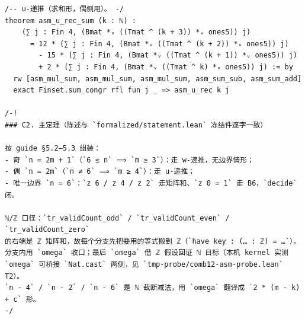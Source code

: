 \documentclass[11pt]{article}
\begin{document}
\begin{lstlisting}
/-- u-递推（求和形，偶侧用）。 -/
theorem asm_u_rec_sum (k : ℕ) :
    (∑ j : Fin 4, (Bmat *ᵥ ((Tmat ^ (k + 3)) *ᵥ ones5)) j)
      = 12 * (∑ j : Fin 4, (Bmat *ᵥ ((Tmat ^ (k + 2)) *ᵥ ones5)) j)
        - 15 * (∑ j : Fin 4, (Bmat *ᵥ ((Tmat ^ (k + 1)) *ᵥ ones5)) j)
        + 2 * (∑ j : Fin 4, (Bmat *ᵥ ((Tmat ^ k) *ᵥ ones5)) j) := by
  rw [asm_mul_sum, asm_mul_sum, asm_mul_sum, asm_sum_sub, asm_sum_add]
  exact Finset.sum_congr rfl fun j _ => asm_u_rec k j

/-!
### C2. 主定理（陈述与 `formalized/statement.lean` 冻结件逐字一致）

按 guide §5.2–5.3 组装：
- 奇 `n = 2m + 1`（`6 ≤ n` ⟹ `m ≥ 3`）：走 w-递推，无边界情形；
- 偶 `n = 2m`（`n ≠ 6` ⟹ `m ≥ 4`）：走 u-递推；
- 唯一边界 `n = 6`：`z 6 / z 4 / z 2` 走矩阵和、`z 0 = 1` 走 B6，`decide` 闭。

ℕ/ℤ 口径：`tr_validCount_odd` / `tr_validCount_even` / `tr_validCount_zero`
的右端是 ℤ 矩阵和，故每个分支先把要用的等式搬到 ℤ（`have key : (… : ℤ) = …`），
分支内用 `omega` 收口；最后 `omega` 借 ℤ 假设回证 ℕ 目标（本机 kernel 实测
`omega` 可桥接 `Nat.cast` 两侧，见 `tmp-probe/comb12-asm-probe.lean` T2）。
`n - 4` / `n - 2` / `n - 6` 是 ℕ 截断减法，用 `omega` 翻译成 `2 * (m - k) + c` 形。
-/


\end{lstlisting}
\end{document}
